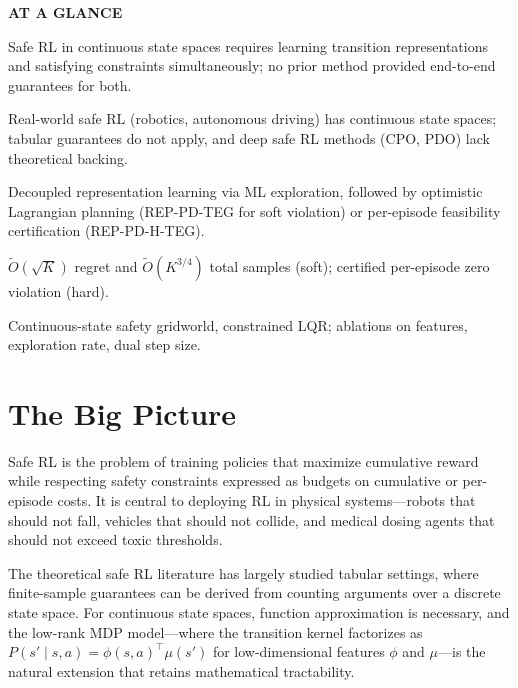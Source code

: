 \documentclass[10pt,twocolumn]{article}
\begin{document}
\begin{mdframed}[backgroundcolor=boxgray,linecolor=rulered,linewidth=1pt,
    innerleftmargin=6pt,innerrightmargin=6pt,
    innertopmargin=6pt,innerbottommargin=6pt]
\textbf{\small AT A GLANCE}\par\vspace{4pt}
\begin{description}[leftmargin=0pt,labelsep=4pt,itemsep=2pt,parsep=0pt,
    font=\small\bfseries]
  \item[Problem:] Safe RL in continuous state spaces requires learning
    transition representations and satisfying constraints simultaneously;
    no prior method provided end-to-end guarantees for both.
  \item[Why it matters:] Real-world safe RL (robotics, autonomous driving)
    has continuous state spaces; tabular guarantees do not apply, and
    deep safe RL methods (CPO, PDO) lack theoretical backing.
  \item[Method:] Decoupled representation learning via ML exploration,
    followed by optimistic Lagrangian planning (REP-PD-TEG for soft
    violation) or per-episode feasibility certification (REP-PD-H-TEG).
  \item[Result:] $\tilde{O}(\sqrt{K})$ regret and $\tilde{O}(K^{3/4})$
    total samples (soft); certified per-episode zero violation (hard).
  \item[Evidence:] Continuous-state safety gridworld, constrained LQR;
    ablations on features, exploration rate, dual step size.
\end{description}
\end{mdframed}

\section{The Big Picture}

Safe RL is the problem of training policies that maximize cumulative reward
while respecting safety constraints expressed as budgets on cumulative or
per-episode costs. It is central to deploying RL in physical systems---robots
that should not fall, vehicles that should not collide, and medical dosing
agents that should not exceed toxic thresholds.

The theoretical safe RL literature has largely studied tabular settings, where
finite-sample guarantees can be derived from counting arguments over a discrete
state space. For continuous state spaces, function approximation is necessary,
and the low-rank MDP model---where the transition kernel factorizes as
$P(s' \mid s, a) = \phi(s, a)^\top \mu(s')$ for low-dimensional features
$\phi$ and $\mu$---is the natural extension that retains mathematical tractability.
\end{document}

